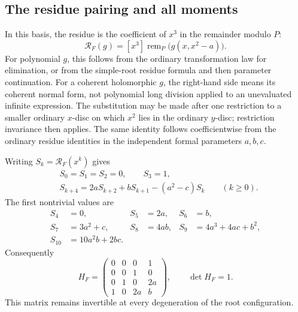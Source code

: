 \documentclass[11pt,letterpaper]{article}
\theoremstyle{definition}
\theoremstyle{remark}
\newcommand{\RF}{\mathcal R_F}
\numberwithin{equation}{section}
\begin{document}
\subsection{The residue pairing and all moments}
In this basis, the residue is the coefficient of $x^3$ in the remainder modulo $P$:
\begin{equation}\label{eq:quartic-residue}
 \RF(g)= [x^3]\operatorname{rem}_{P}\bigl(g(x,x^2-a)\bigr).
\end{equation}
For polynomial $g$, this follows from the ordinary transformation law for elimination, or from the simple-root residue formula and then parameter continuation. For a coherent holomorphic $g$, the right-hand side means its coherent normal form, not polynomial long division applied to an unevaluated infinite expression. The substitution may be made after one restriction to a smaller ordinary $x$-disc on which $x^2$ lies in the ordinary $y$-disc; restriction invariance then applies. The same identity follows coefficientwise from the ordinary residue identities in the independent formal parameters $a,b,c$.

Writing $S_k=\RF(x^k)$ gives
\begin{align}
&S_0=S_1=S_2=0,\qquad S_3=1,\label{eq:moments-init}\\
&S_{k+4}=2aS_{k+2}+bS_{k+1}-(a^2-c)S_k\qquad(k\ge0).\label{eq:moments-recursion}
\end{align}
The first nontrivial values are
\begin{align*}
 S_4&=0,& S_5&=2a,& S_6&=b,\\
 S_7&=3a^2+c,& S_8&=4ab,& S_9&=4a^3+4ac+b^2,\\
 S_{10}&=10a^2b+2bc.&&&&
\end{align*}
Consequently
\begin{equation}\label{eq:quartic-H}
 H_F=\begin{pmatrix}
 0&0&0&1\\
 0&0&1&0\\
 0&1&0&2a\\
 1&0&2a&b
 \end{pmatrix},\qquad\det H_F=1.
\end{equation}
This matrix remains invertible at every degeneration of the root configuration.
\end{document}
